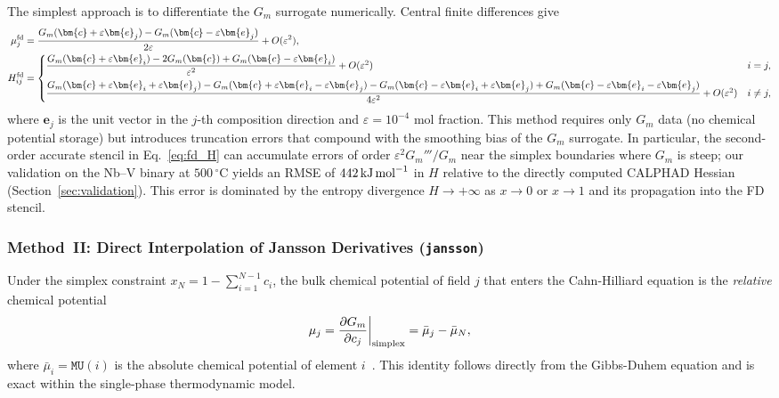 The simplest approach is to differentiate the $G_m$ surrogate
numerically.  Central finite differences give
\begin{align}
  \mu_j^{\rm fd}
  &= \frac{G_m(\bm{c}+\varepsilon\bm{e}_j)
           - G_m(\bm{c}-\varepsilon\bm{e}_j)}{2\varepsilon}
  + O(\varepsilon^2),
  \label{eq:fd_mu}
  \\
  H_{ij}^{\rm fd}
  &= \begin{cases}
       \dfrac{G_m(\bm{c}+\varepsilon\bm{e}_i)
              - 2G_m(\bm{c})
              + G_m(\bm{c}-\varepsilon\bm{e}_i)}{\varepsilon^2}
       + O(\varepsilon^2) & i = j,\\[8pt]
       \dfrac{G_m(\bm{c}+\varepsilon\bm{e}_i+\varepsilon\bm{e}_j)
              - G_m(\bm{c}+\varepsilon\bm{e}_i-\varepsilon\bm{e}_j)
              - G_m(\bm{c}-\varepsilon\bm{e}_i+\varepsilon\bm{e}_j)
              + G_m(\bm{c}-\varepsilon\bm{e}_i-\varepsilon\bm{e}_j)}{4\varepsilon^2}
       + O(\varepsilon^2) & i \neq j,
     \end{cases}
  \label{eq:fd_H}
\end{align}
where $\bm{e}_j$ is the unit vector in the $j$-th composition
direction and $\varepsilon = 10^{-4}$ mol fraction.
This method requires only $G_m$ data (no chemical potential storage)
but introduces truncation errors that compound with the smoothing
bias of the $G_m$ surrogate.  In particular, the second-order
accurate stencil in Eq.~\eqref{eq:fd_H} can accumulate errors of
order $\varepsilon^2 G_m'''/G_m$ near the simplex boundaries where
$G_m$ is steep; our validation on the Nb--V binary at $500\,^\circ$C
yields an RMSE of $442\,\text{kJ\,mol}^{-1}$ in $H$ relative to the
directly computed CALPHAD Hessian (Section~\ref{sec:validation}).
This error is dominated by the entropy divergence
$H \to +\infty$ as $x \to 0$ or $x \to 1$ and its propagation
into the FD stencil.

\subsubsection{Method~II: Direct Interpolation of Jansson Derivatives (\texttt{jansson})}
\label{sec:jansson}

Under the simplex constraint $x_N = 1 - \sum_{i=1}^{N-1} c_i$, the
bulk chemical potential of field $j$ that enters the Cahn-Hilliard
equation is the \emph{relative} chemical potential
\begin{equation}
  \mu_j = \frac{\partial G_m}{\partial c_j}\bigg|_{\rm simplex}
        = \bar{\mu}_j - \bar{\mu}_N,
  \label{eq:mu_rel}
\end{equation}
where $\bar{\mu}_i = \texttt{MU}(i)$ is the absolute chemical
potential of element $i$~\cite{deFontaine1979}.  This identity
follows directly from the Gibbs-Duhem equation and is exact within
the single-phase thermodynamic model.

